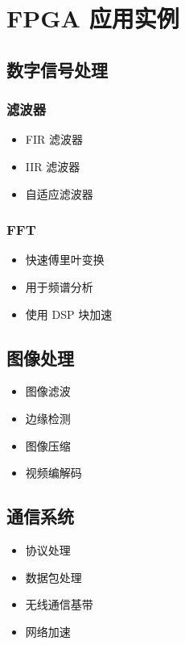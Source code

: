 \section{FPGA 应用实例}

\subsection{数字信号处理}

\subsubsection{滤波器}

\begin{itemize}
  \item FIR 滤波器
  \item IIR 滤波器
  \item 自适应滤波器
\end{itemize}

\subsubsection{FFT}

\begin{itemize}
  \item 快速傅里叶变换
  \item 用于频谱分析
  \item 使用 DSP 块加速
\end{itemize}

\subsection{图像处理}

\begin{itemize}
  \item 图像滤波
  \item 边缘检测
  \item 图像压缩
  \item 视频编解码
\end{itemize}

\subsection{通信系统}

\begin{itemize}
  \item 协议处理
  \item 数据包处理
  \item 无线通信基带
  \item 网络加速
\end{itemize}

